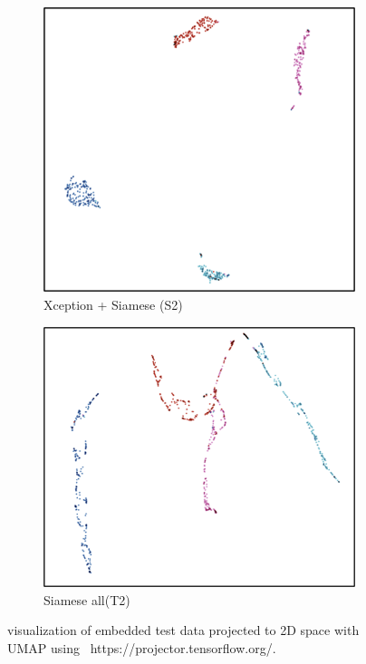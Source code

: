 \begin{figure}[h]
  \centering
  \begin{subfigure}[b]{0.48\linewidth}
   \includegraphics[width=\linewidth]{figs/umab_visualS2.png}
   \caption{Xception + Siamese (S2)}
   \label{fig:tri_loss}
  \end{subfigure}
  \hfill
   \begin{subfigure}[b]{0.48\linewidth}
  \includegraphics[width=\linewidth]{figs/umab_visualT2.png}
  \caption{Siamese all(T2)}
  \label{fig:con_loss}
  \end{subfigure}
    \hfill
    \caption{visualization of embedded test data projected to 2D space with UMAP using  https://projector.tensorflow.org/.}
    \label{fig:2Dprojection}
\end{figure}

